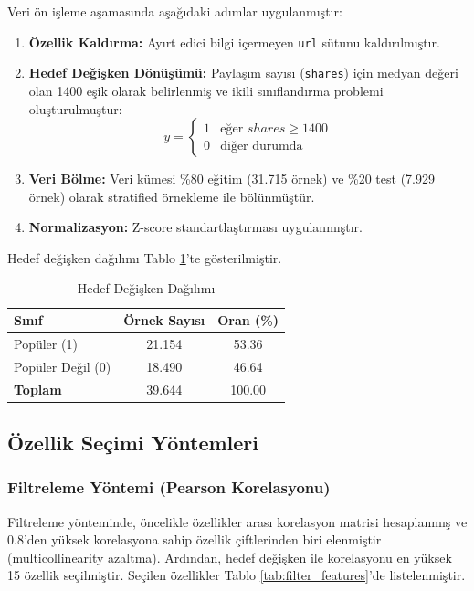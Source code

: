 \documentclass[conference]{IEEEtran}
\begin{document}
Veri ön işleme aşamasında aşağıdaki adımlar uygulanmıştır:

\begin{enumerate}
    \item \textbf{Özellik Kaldırma:} Ayırt edici bilgi içermeyen \texttt{url} sütunu kaldırılmıştır.
    \item \textbf{Hedef Değişken Dönüşümü:} Paylaşım sayısı (\texttt{shares}) için medyan değeri olan 1400 eşik olarak belirlenmiş ve ikili sınıflandırma problemi oluşturulmuştur:
    \begin{equation}
        y = \begin{cases} 
        1 & \text{eğer } shares \geq 1400 \\
        0 & \text{diğer durumda}
        \end{cases}
    \end{equation}
    \item \textbf{Veri Bölme:} Veri kümesi \%80 eğitim (31.715 örnek) ve \%20 test (7.929 örnek) olarak stratified örnekleme ile bölünmüştür.
    \item \textbf{Normalizasyon:} Z-score standartlaştırması uygulanmıştır.
\end{enumerate}

Hedef değişken dağılımı Tablo \ref{tab:target_dist}'te gösterilmiştir.

\begin{table}[H]
\centering
\caption{Hedef Değişken Dağılımı}
\label{tab:target_dist}
\begin{tabular}{lcc}
\toprule
\textbf{Sınıf} & \textbf{Örnek Sayısı} & \textbf{Oran (\%)} \\
\midrule
Popüler (1) & 21.154 & 53.36 \\
Popüler Değil (0) & 18.490 & 46.64 \\
\midrule
\textbf{Toplam} & 39.644 & 100.00 \\
\bottomrule
\end{tabular}
\end{table}

\subsection{Özellik Seçimi Yöntemleri}

\subsubsection{Filtreleme Yöntemi (Pearson Korelasyonu)}

Filtreleme yönteminde, öncelikle özellikler arası korelasyon matrisi hesaplanmış ve 0.8'den yüksek korelasyona sahip özellik çiftlerinden biri elenmiştir (multicollinearity azaltma). Ardından, hedef değişken ile korelasyonu en yüksek 15 özellik seçilmiştir. Seçilen özellikler Tablo \ref{tab:filter_features}'de listelenmiştir.
\end{document}
